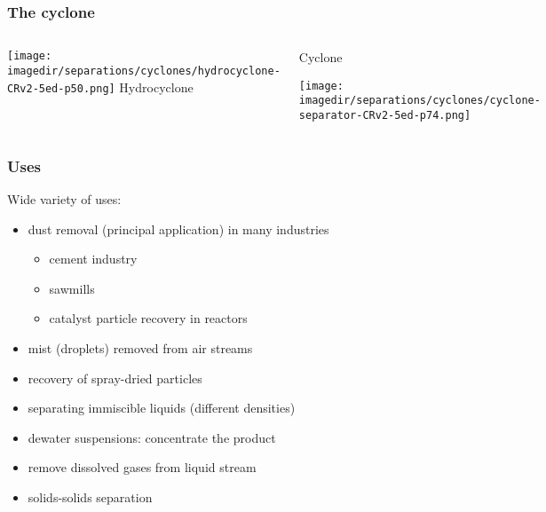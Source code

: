 \begin{frame}\frametitle{The cyclone}
	\vspace{-24pt}
	\begin{columns}[b]
			\begin{center}
				\texttt{[image: \\imagedir/separations/cyclones/hydrocyclone-CRv2-5ed-p50.png]}
				Hydrocyclone
			\end{center}
			\begin{center}
				Cyclone
				\vspace{12pt}
				
				\texttt{[image: \\imagedir/separations/cyclones/cyclone-separator-CRv2-5ed-p74.png]}
			\end{center}
	\end{columns}
\end{frame}

\begin{frame}\frametitle{Uses}
	Wide variety of uses:
	\begin{itemize}
		\item	dust removal (principal application) in many industries
			\begin{itemize}
				\item	cement industry
				\item	sawmills
				\item	catalyst particle recovery in reactors
			\end{itemize}
		\item	mist (droplets) removed from air streams
		\item	recovery of spray-dried particles
		\item	separating immiscible liquids (different densities)
		\item	dewater suspensions: concentrate the product
		\item	remove dissolved gases from liquid stream
		\item	solids-solids separation
	\end{itemize}
\end{frame}

